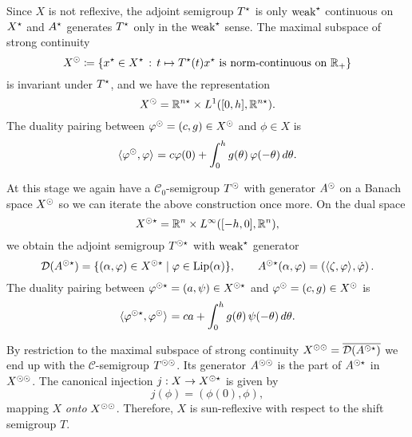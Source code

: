 Since $X$ is not reflexive, the adjoint semigroup $T^{\star}$ is 
only $\text{weak}^{\star}$ continuous on $X^{\star}$ and $A^{\star}$ generates $T^{\star}$
only in the $\text{weak}^{\star}$ sense. The maximal subspace of strong continuity
\[
X^{\odot} \coloneqq \left\{x^{\star} \in X^{\star} \,:\, 
    t \mapsto T^{\star}(t)x^{\star} \text{ is norm-continuous on } \mathbb{R}_+\right\}
\]
is invariant under $T^{\star}$, and we have the representation
\begin{equation}
  \label{btdde:eq:xsun_dde}
  X^{\odot} = \mathbb{R}^{n\star} \times L^1([0,h],\mathbb{R}^{n\star}).
\end{equation}
%
The duality pairing between $\varphi^{\odot} = (c,g) \in X^{\odot}$ and $\phi \in X$ is
\begin{equation}
  \label{btdde:eq:pairing_X_sun_X}
  \langle \varphi^{\odot},\varphi \rangle_{} = c\varphi(0)+ \int_{0}^{h}g(\theta)\,\varphi(-\theta)\,d\theta.
\end{equation}

At this stage we again have a $\mathcal{C}_0$-semigroup $T^{\odot}$ with
generator $A^{\odot}$ on a Banach space $X^{\odot}$ so we can iterate the above
construction once more. On the dual space 
  \[
    X^{\odot\star} = \mathbb{R}^n \times L^\infty([-h,0], \mathbb{R}^n),
  \]
we obtain the adjoint semigroup $T^{\odot\star}$ with $\text{weak}^{\star}$ generator  
\begin{equation}
    \label{btdde:eq:A_sunstar}
    \mathcal{D}{(A^{\odot\star})}  = \{ (\alpha,\varphi) \in X^{\odot\star} \mid \varphi \in \operatorname{Lip}(\alpha) \}, 
    \qquad 
    A^{\odot\star}(\alpha,\varphi) = \left( \langle \zeta,\varphi \rangle_{}, \dot {\varphi} \right).
\end{equation}
The duality pairing between $\varphi^{\odot\star} = (a,\psi) \in X^{\odot\star}$ and
$\varphi^{\odot} = (c,g) \in X^{\odot}$ is
\begin{equation}
  \label{btdde:eq:pairing_X_sun_star_X_sun}
  \langle \varphi^{\odot\star},\varphi^{\odot} \rangle_{} = 
    ca + \int_{0}^{h}g(\theta)\,\psi(-\theta)\,d\theta.
\end{equation}

By restriction to the maximal subspace of strong continuity $X^{\odot\odot} =
\overline{\mathcal{D}(A^{\odot\star})}$ we end up with the $\mathcal{C}$-semigroup
$T^{\odot\odot}$. Its generator $A^{\odot\odot}$ is the part of $A^{\odot\star}$ in
$X^{\odot\odot}$.
The canonical injection $j : X \to X^{\odot\star}$ is given by
\begin{equation}
    \label{btdde:eq:j}
    j(\phi) = \left(\phi(0), \phi \right),
\end{equation}
mapping $X$ \emph{onto} $X^{\odot\odot}$. Therefore, $X$ is sun-reflexive with
respect to the shift semigroup $T$.

